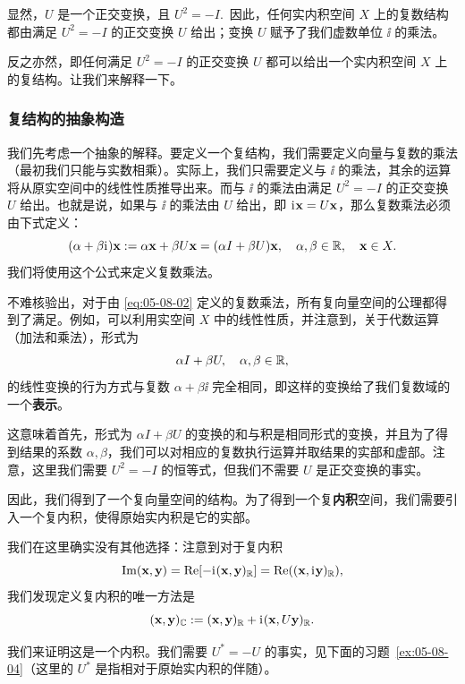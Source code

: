 显然，$U$ 是一个正交变换，且 $U^2 = -I$.~因此，任何实内积空间 $X$ 上的复数结构都由满足 $U^2 = -I$ 的正交变换 $U$ 给出；变换 $U$ 赋予了我们虚数单位 $\ii$ 的乘法。

反之亦然，即任何满足 $U^2 = -I$ 的正交变换 $U$ 都可以给出一个实内积空间 $X$ 上的复结构。让我们来解释一下。

\subsubsection{复结构的抽象构造}\label{sec:05-08-03-03}


我们先考虑一个抽象的解释。要定义一个复结构，我们需要定义向量与复数的乘法（最初我们只能与实数相乘）。实际上，我们只需要定义与 $\ii$ 的乘法，其余的运算将从原实空间中的线性性质推导出来。而与 $\ii$ 的乘法由满足 $U^2 = -I$ 的正交变换 $U$ 给出。也就是说，如果与 $\ii$ 的乘法由 $U$ 给出，即 $\mathrm{i}\mkern1mu\mathbf{x} = U\mathbf{x}$，那么复数乘法必须由下式定义：
\begin{equation}\label{eq:05-08-02}
( \alpha + \beta \mathrm{i}\mkern1mu ) \mathbf{x} := \alpha \mathbf{x} + \beta U \mathbf{x} = (\alpha I + \beta U) \mathbf{x}, \quad \alpha, \beta \in \mathbb{R}, \quad \mathbf{x} \in X.
\end{equation}
我们将使用这个公式来定义复数乘法。

不难核验出，对于由 \eqref{eq:05-08-02} 定义的复数乘法，所有复向量空间的公理都得到了满足。例如，可以利用实空间 $X$ 中的线性性质，并注意到，关于代数运算（加法和乘法），形式为 $$\alpha I + \beta U, \quad \alpha, \beta \in \mathbb{R},$$
的线性变换的行为方式与复数 $\alpha + \beta \ii$ 完全相同，即这样的变换给了我们复数域的一个\textbf{表示}。

这意味着首先，形式为 $\alpha I + \beta U$ 的变换的和与积是相同形式的变换，并且为了得到结果的系数 $\alpha, \beta$，我们可以对相应的复数执行运算并取结果的实部和虚部。注意，这里我们需要 $U^2 = -I$ 的恒等式，但我们不需要 $U$ 是正交变换的事实。

因此，我们得到了一个复向量空间的结构。为了得到一个复\textbf{内积}空间，我们需要引入一个复内积，使得原始实内积是它的实部。

我们在这里确实没有其他选择：注意到对于复内积 $$\operatorname{Im}(\mathbf{x}, \mathbf{y}) = \operatorname{Re}[-\mathrm{i}\mkern1mu(\mathbf{x}, \mathbf{y})_{\mathbb{R}}] = \operatorname{Re}((\mathbf{x}, \mathrm{i}\mkern1mu \mathbf{y})_{\mathbb{R}}),$$
我们发现定义复内积的唯一方法是
\begin{equation}\label{eq:05-08-03}
(\mathbf{x}, \mathbf{y})_{\mathbb{C}} := (\mathbf{x}, \mathbf{y})_{\mathbb{R}} + \mathrm{i}\mkern1mu(\mathbf{x}, U\mathbf{y})_{\mathbb{R}}.
\end{equation}

我们来证明这是一个内积。我们需要 $U^* = -U$ 的事实，见下面的习题~\ref{ex:05-08-04}（这里的 $U^*$ 是指相对于原始实内积的伴随）。

